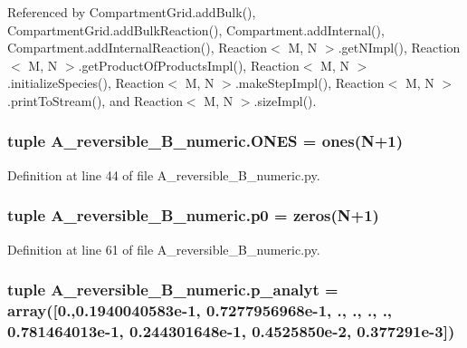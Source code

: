 Referenced by Compartment\+Grid.\+add\+Bulk(), Compartment\+Grid.\+add\+Bulk\+Reaction(), Compartment.\+add\+Internal(), Compartment.\+add\+Internal\+Reaction(), Reaction$<$ M, N $>$.\+get\+N\+Impl(), Reaction$<$ M, N $>$.\+get\+Product\+Of\+Products\+Impl(), Reaction$<$ M, N $>$.\+initialize\+Species(), Reaction$<$ M, N $>$.\+make\+Step\+Impl(), Reaction$<$ M, N $>$.\+print\+To\+Stream(), and Reaction$<$ M, N $>$.\+size\+Impl().

\hypertarget{namespaceA__reversible__B__numeric_ab14192a58d248288a57a53a88e824aa1}{
\subsubsection[{O\+N\+E\+S}]{\setlength{\rightskip}{0pt plus 5cm}tuple A\+\_\+reversible\+\_\+\+B\+\_\+numeric.\+O\+N\+E\+S = ones({\bf N}+1)}}\label{namespaceA__reversible__B__numeric_ab14192a58d248288a57a53a88e824aa1}


Definition at line 44 of file A\+\_\+reversible\+\_\+\+B\+\_\+numeric.\+py.

\hypertarget{namespaceA__reversible__B__numeric_ad5efb9fc14774d8a02dccd90d7978214}{
\subsubsection[{p0}]{\setlength{\rightskip}{0pt plus 5cm}tuple A\+\_\+reversible\+\_\+\+B\+\_\+numeric.\+p0 = zeros({\bf N}+1)}}\label{namespaceA__reversible__B__numeric_ad5efb9fc14774d8a02dccd90d7978214}


Definition at line 61 of file A\+\_\+reversible\+\_\+\+B\+\_\+numeric.\+py.

\hypertarget{namespaceA__reversible__B__numeric_a2f98730f45b559f9aece65c8682734bf}{
\subsubsection[{p\+\_\+analyt}]{\setlength{\rightskip}{0pt plus 5cm}tuple A\+\_\+reversible\+\_\+\+B\+\_\+numeric.\+p\+\_\+analyt = array(\mbox{[}0.,0.\+1940040583e-\/1, 0.\+7277956968e-\/1, ., ., ., ., 0.\+781464013e-\/1, 0.\+244301648e-\/1, 0.\+4525850e-\/2, 0.\+377291e-\/3\mbox{]})}}\label{namespaceA__reversible__B__numeric_a2f98730f45b559f9aece65c8682734bf}


